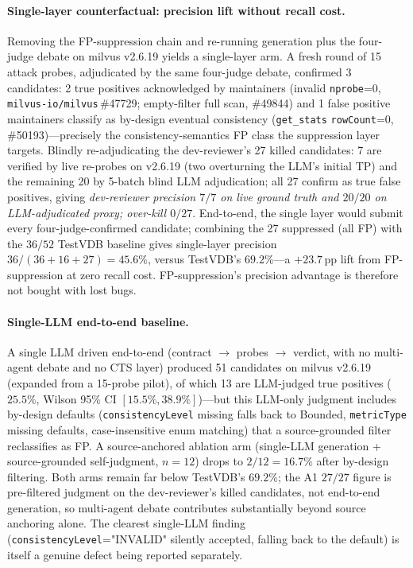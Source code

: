 \documentclass[sigconf]{acmart}
\begin{document}
\paragraph{Single-layer counterfactual: precision lift without recall cost.} Removing the FP-suppression chain and re-running generation plus the four-judge debate on milvus v2.6.19 yields a single-layer arm. A fresh round of 15 attack probes, adjudicated by the same four-judge debate, confirmed 3 candidates: 2 true positives acknowledged by maintainers (invalid \texttt{nprobe}=0, \texttt{milvus-io/milvus}\,\#47729; empty-filter full scan, \#49844) and 1 false positive maintainers classify as by-design eventual consistency (\texttt{get\_stats} \texttt{rowCount}=0, \#50193)---precisely the consistency-semantics FP class the suppression layer targets. Blindly re-adjudicating the dev-reviewer's 27 killed candidates: 7 are verified by live re-probes on v2.6.19 (two overturning the LLM's initial TP) and the remaining 20 by 5-batch blind LLM adjudication; all 27 confirm as true false positives, giving \emph{dev-reviewer precision $7/7$ on live ground truth and $20/20$ on LLM-adjudicated proxy; over-kill $0/27$}. End-to-end, the single layer would submit every four-judge-confirmed candidate; combining the 27 suppressed (all FP) with the $36/52$ TestVDB baseline gives single-layer precision $36/(36{+}16{+}27) = 45.6\%$, versus TestVDB's $69.2\%$---a $+23.7$\,pp lift from FP-suppression at zero recall cost. FP-suppression's precision advantage is therefore not bought with lost bugs.

\paragraph{Single-LLM end-to-end baseline.} A single LLM driven end-to-end (contract $\to$ probes $\to$ verdict, with no multi-agent debate and no CTS layer) produced 51 candidates on milvus v2.6.19 (expanded from a 15-probe pilot), of which 13 are LLM-judged true positives ($25.5\%$, Wilson 95\% CI $[15.5\%, 38.9\%]$)---but this LLM-only judgment includes by-design defaults (\texttt{consistencyLevel} missing falls back to Bounded, \texttt{metricType} missing defaults, case-insensitive enum matching) that a source-grounded filter reclassifies as FP. A source-anchored ablation arm (single-LLM generation + source-grounded self-judgment, $n{=}12$) drops to $2/12 = 16.7\%$ after by-design filtering. Both arms remain far below TestVDB's $69.2\%$; the A1 $27/27$ figure is pre-filtered judgment on the dev-reviewer's killed candidates, not end-to-end generation, so multi-agent debate contributes substantially beyond source anchoring alone. The clearest single-LLM finding (\texttt{consistencyLevel}="INVALID" silently accepted, falling back to the default) is itself a genuine defect being reported separately.
\end{document}
